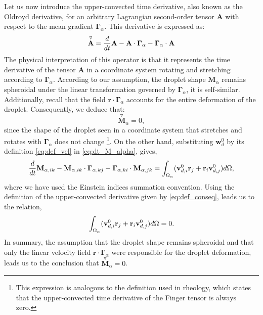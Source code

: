 Let us now introduce the upper-convected time derivative, also known as the Oldroyd derivative, for an arbitrary Lagrangian second-order tensor $\textbf{A}$ with respect to the mean gradient $\bm\Gamma_\alpha$. 
This derivative is expressed as: 
\begin{equation}
    \overset{\triangledown  }{\textbf{A}}
    = 
    \ddt \textbf{A}
    - \textbf{A} \cdot \bm\Gamma_\alpha
    - \bm\Gamma_\alpha \cdot \textbf{A}
    \label{eq:def_upper}
\end{equation}
The physical interpretation of this operator is that it represents the time derivative of the tensor $\textbf{A}$ in a coordinate system rotating and stretching according to $\bm\Gamma_\alpha$.  
According to our assumption, the droplet shape $\textbf{M}_\alpha$ remains spheroidal under the linear transformation governed by $\bm\Gamma_\alpha$, it is self-similar. 
Additionally, recall that the field $\textbf{r}\cdot \bm\Gamma_\alpha$ accounts for the entire deformation of the droplet. 
Consequently, we deduce that:
\begin{equation}
    \overset{ \triangledown  }{\textbf{M}}_\alpha
    = 0, 
    \label{eq:def_conseq}
\end{equation}
since the shape of the droplet seen in a coordinate system that stretches and rotates with $\bm\Gamma_\alpha$ does not change \footnote{
    This expression is analogous to the definition used in rheology, which states that the upper-convected time derivative of the Finger tensor is always zero.
}.
On the other hand, substituting $\textbf{w}_d^0$ by its definition \eqref{eq:def_vel} in \ref{eq:dt_M_alpha}, gives, 
\begin{equation}
    \frac{d}{dt} \textbf{M}_{\alpha,ik}
    -
    \textbf{M}_{\alpha,ik} \cdot \bm\Gamma_{\alpha,kj}
    -  \bm\Gamma_{\alpha,ki} \cdot \textbf{M}_{\alpha,jk}
    =
    \int_{\Omega_{\alpha}}  
        (\textbf{v}_{d,i}^0\textbf{r}_j
        + \textbf{r}_i\textbf{v}_{d,j}^0)
     d\Omega,
\end{equation}
where we have used the Einstein indices summation convention. 
Using the definition of the upper-convected derivative given by \ref{eq:def_conseq}, leads us to the relation,
\begin{equation}
    \intO{ 
        (\textbf{v}_{d,i}^0\textbf{r}_j
        + \textbf{r}_i\textbf{v}_{d,j}^0)
    }
    =
    0.  
    \label{eq:def_v}
\end{equation}
In summary, the assumption that the droplet shape remains spheroidal and that only the linear velocity field $\textbf{r}\cdot \bm\Gamma_\alpha$ were responsible for the droplet deformation, leads us to the conclusion that $\overset{\triangledown}{\textbf{M}}_\alpha= 0$. 
